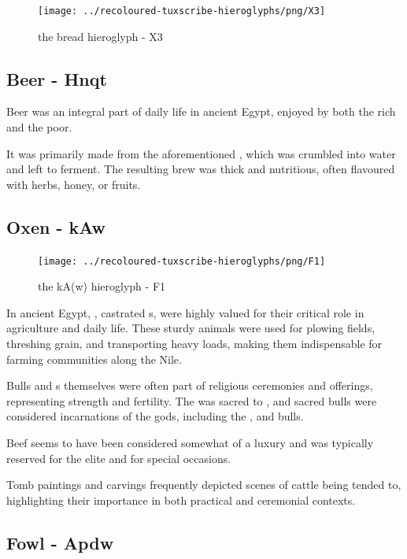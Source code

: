 \begin{figure} [H]
	\centering
	\texttt{[image: ../recoloured-tuxscribe-hieroglyphs/png/X3]}
	\caption{the bread hieroglyph - X3}
\end{figure}

\subsection*{Beer - Hnqt}

Beer was an integral part of daily life in ancient Egypt, enjoyed by both the rich and the poor.

It was primarily made from the aforementioned , which was crumbled into water and left to ferment. The resulting brew was thick and nutritious, often flavoured with herbs, honey, or fruits.

\subsection*{Oxen - kAw}

\begin{figure} [H]
	\centering
	\texttt{[image: ../recoloured-tuxscribe-hieroglyphs/png/F1]}
	\caption{the kA(w) hieroglyph - F1}
\end{figure}

In ancient Egypt, , castrated s, were highly valued for their critical role in agriculture and daily life. These sturdy animals were used for plowing fields, threshing grain, and transporting heavy loads, making them indispensable for farming communities along the Nile.

Bulls and s themselves were often part of religious ceremonies and offerings, representing strength and fertility. The  was sacred to , and sacred bulls were considered incarnations of the gods, including the ,  and  bulls.

Beef seems to have been considered somewhat of a luxury and was typically reserved for the elite and for special occasions.

Tomb paintings and carvings frequently depicted scenes of cattle being tended to, highlighting their importance in both practical and ceremonial contexts.

\subsection*{Fowl - Apdw}

